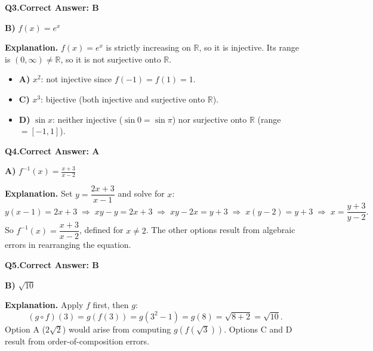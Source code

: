 \documentclass[11pt]{article}
\begin{document}
\bigskip

\noindent\textbf{Q3.}\quad\textbf{Correct Answer: B}

\begin{correctbox}
\textbf{B)}\; $f(x) = e^x$
\end{correctbox}

\medskip
\noindent\textbf{Explanation.}\enspace
$f(x) = e^x$ is strictly increasing on $\mathbb{R}$, so it is injective.
Its range is $(0,\infty) \neq \mathbb{R}$, so it is not surjective onto $\mathbb{R}$.
\begin{itemize}[nosep,leftmargin=1.3em]
  \item \textbf{A)} $x^2$: not injective since $f(-1)=f(1)=1$.
  \item \textbf{C)} $x^3$: bijective (both injective and surjective onto $\mathbb{R}$).
  \item \textbf{D)} $\sin x$: neither injective ($\sin 0 = \sin \pi$) nor surjective onto $\mathbb{R}$ (range $= [-1,1]$).
\end{itemize}

\bigskip

\noindent\textbf{Q4.}\quad\textbf{Correct Answer: A}

\begin{correctbox}
\textbf{A)}\; $\displaystyle f^{-1}(x) = \frac{x+3}{x-2}$
\end{correctbox}

\medskip
\noindent\textbf{Explanation.}\enspace
Set $y = \dfrac{2x+3}{x-1}$ and solve for $x$:
\[
  y(x-1) = 2x+3
  \;\Rightarrow\; xy - y = 2x+3
  \;\Rightarrow\; xy - 2x = y+3
  \;\Rightarrow\; x(y-2) = y+3
  \;\Rightarrow\; x = \frac{y+3}{y-2}.
\]
So $f^{-1}(x) = \dfrac{x+3}{x-2}$, defined for $x \neq 2$.
The other options result from algebraic errors in rearranging the equation.

\bigskip

\noindent\textbf{Q5.}\quad\textbf{Correct Answer: B}

\begin{correctbox}
\textbf{B)}\; $\sqrt{10}$
\end{correctbox}

\medskip
\noindent\textbf{Explanation.}\enspace
Apply $f$ first, then $g$:
\[
  (g \circ f)(3) = g(f(3)) = g(3^2 - 1) = g(8) = \sqrt{8+2} = \sqrt{10}.
\]
Option A ($2\sqrt{2}$) would arise from computing $g(f(\sqrt{3}))$. Options C and D result from order-of-composition errors.
\end{document}
